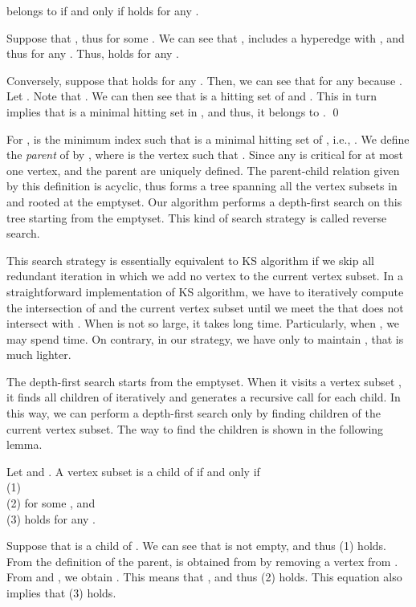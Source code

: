 \begin{lemma}\label{cals}
 belongs to  if and only if
  holds for any .
\end{lemma} 

\proof
Suppose that , thus  for some .
We can see that ,  includes a hyperedge
  with , and thus  for any .
Thus,  holds for any .

Conversely, suppose that  holds for any
 .
Then, we can see that  for any  because
 .
Let .
Note that .
We can then see that  is a hitting set of
  and .
This in turn implies that  is a minimal hitting set in ,
 and thus, it belongs to .
\qed

For ,  is the minimum index  such that 
 is a minimal hitting set of , i.e.,
 .
We define the {\em parent}  of  by , where  is
 the vertex such that .
Since any  is critical for at most one vertex,
  and the parent are uniquely defined.
The parent-child relation given by this definition is acyclic, thus forms
 a tree spanning all the vertex subsets in  and rooted at the emptyset.
Our algorithm performs a depth-first search on this tree starting from
 the emptyset.
This kind of search strategy is called reverse search\cite{AvFk96}.

This search strategy is essentially equivalent to KS algorithm if we skip all
 redundant iteration in which we add no vertex to the current vertex subset.
In a straightforward implementation of KS algorithm, we have to iteratively
 compute the intersection of  and the current vertex subset 
 until we meet the  that does not intersect with .
When  is not so large, it takes long time.
Particularly, when , we may spend 
 time.
On contrary, in our strategy, we have only to maintain ,
 that is much lighter.

The depth-first search starts from the emptyset.
When it visits a vertex subset , it finds all children of  iteratively
 and generates a recursive call for each child.
In this way, we can perform a depth-first search only by finding children of
 the current vertex subset.
The way to find the children is shown in the following lemma.

\begin{lemma}\label{child}
Let  and .
A vertex subset  is a child of  if and only if \\
(1) \\
(2)  for some , and \\
(3)  holds for any .
\end{lemma}

\proof
Suppose that  is a child of .
We can see that  is not empty, and thus (1) holds.
From the definition of the parent,  is obtained from  by removing
 a vertex  from .
From  and , we obtain .
This means that , and thus (2) holds.
This equation also implies that (3) holds.

